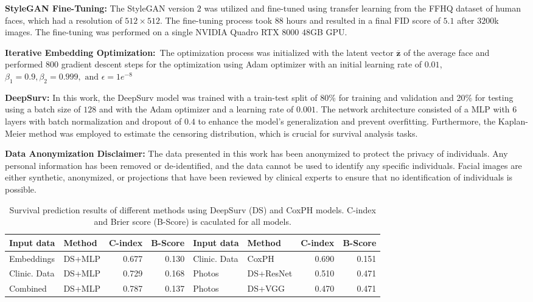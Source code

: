 \documentclass[runningheads]{llncs}
\newcommand{\vz}{\boldsymbol{z}}
\begin{document}
\noindent\textbf{StyleGAN Fine-Tuning:} The StyleGAN version $2$ was utilized and fine-tuned using transfer learning from the FFHQ dataset of human faces, which had a resolution of $512 \times 512$. The fine-tuning process took $88$ hours and resulted in a final FID score of $5.1$ after $3200$k images. The fine-tuning was performed on a single NVIDIA Quadro RTX $8000$ $48$GB GPU.

\noindent\textbf{Iterative Embedding Optimization:}\ The optimization process was initialized with the latent vector $\overline{\vz}$ of the average face and performed $800$ gradient descent steps for the optimization using Adam optimizer with an initial learning rate of $0.01$, $\beta_1 = 0.9, \beta_2 = 0.999, \text{ and } \epsilon = 1e^{-8}$

\noindent\textbf{DeepSurv:} In this work, the DeepSurv model was trained with a train-test split of 80\% for training and validation and 20\% for testing using a batch size of $128$ and with the Adam optimizer and a learning rate of $0.001$. The network architecture consisted of a MLP with $6$ layers with batch normalization and dropout of $0.4$ to enhance the model's generalization and prevent overfitting. Furthermore, the Kaplan-Meier method was employed to estimate the censoring distribution, which is crucial for survival analysis tasks.

\noindent\textbf{Data Anonymization Disclaimer:} The data presented in this work has been anonymized to protect the privacy of individuals. Any personal information has been removed or de-identified, and the data cannot be used to identify any specific individuals. Facial images are either synthetic, anonymized, or projections that have been reviewed by clinical experts to ensure that no identification of individuals is possible.



\begin{table}[b]
\caption{Survival prediction results of different methods using DeepSurv (DS) and CoxPH models. C-index and Brier score (B-Score) is caculated for all models.}
\label{Tab:accuracy}
\centering
\begin{tabular}{l|l r r||l| l r r}
\hline
\textbf{Input data}& \textbf{Method} & \textbf{C-index} & \textbf{B-Score} & \textbf{Input data} & \textbf{Method} & \textbf{C-index} & \textbf{B-Score} \\
\hline
Embeddings & DS+MLP &0.677 & 0.130 & Clinic. Data & CoxPH & 0.690 & 0.151\\ 
 
 Clinic. Data&DS+MLP  & 0.729 & 0.168 &Photos& DS+ResNet& 0.510 & 0.471\\
Combined& DS+MLP& 0.787 & 0.137 &Photos &DS+VGG & 0.470 & 0.471 \\
\hline
\end{tabular}
\end{table}
\end{document}
